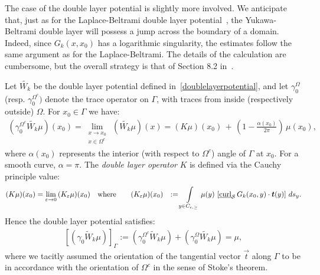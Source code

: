 The case of the double layer potential is slightly more involved. We
anticipate that, just as for the Laplace-Beltrami double layer
potential~\cite{gemmrich}, the Yukawa-Beltrami double layer will possess
a jump across the boundary of a domain.  Indeed, since $G_k(x,x_0)$ has
a logarithmic singularity, the estimates follow the same argument as for
the Laplace-Beltrami. The details of the calculation are cumbersome, but
the overall strategy is that of Section 8.2 in~\cite{hackbusch}.

\begin{lemma} 
\label{l:DLPjump} 
Let $\widetilde{W_k}$ be the double layer potential defined
in~\eqref{doublelayerpotential}, and let $\gamma_0^{\Omega}$ (resp.
$\gamma_0^{\Omega^c})$ denote the trace operator on $\Gamma$, with
traces from inside (respectively outside) $\Omega$.  For $x_{0} \in
\Gamma$ we have:
\begin{align*} 
  (\gamma^{\Omega^{c}}_0\widetilde{W_k}\mu)(x_0)=
  \lim\limits_{\substack{x \to x_0 \\ x \in \Omega^{c}}}\, 
  (\widetilde{W_k}\mu)(x) =
  (K\mu)(x_0)\,+\,\left(1-\frac{\alpha(x_0)}{2\pi}\right)\,\mu(x_0),
\end{align*}
where $\alpha(x_{0})$ represents the interior (with respect to
$\Omega^{c}$) angle of $\Gamma$ at $x_{0}$. For a smooth curve, $\alpha
= \pi$. The {\it double layer operator} $K$ is defined via the Cauchy
principle value: 
\begin{align*}
  (K\mu)(x_0)&=\lim_{\varepsilon\rightarrow 0}
  \, (K_{\varepsilon}\mu)(x_0) \quad \mbox{where}\qquad
  (K_{\varepsilon}\mu)(x_0)&:=\int\limits_{y\in C_{\epsilon,\geq}} 
  \mu(y)\,\left[\underline{\mbox{curl}}_{\S}
  \,G_k(x_{0},y)\cdot\vec{t}(y)\right]\,ds_{y}.
\end{align*}
Hence the double layer potential satisfies:
\begin{align*}
  \left[(\gamma_0\widetilde W_k\mu) \right]_\Gamma := 
  (\gamma^{\Omega^{c}}_0\widetilde W_k\mu)+(\gamma^{\Omega}_{0} 
  \widetilde{W_k}\mu)=\mu,
\end{align*}
where we tacitly assumed the orientation of the tangential vector
$\vec{t}$ along $\Gamma$ to be in accordance with the orientation of
$\Omega^{c}$ in the sense of Stoke's theorem.

\end{lemma}

